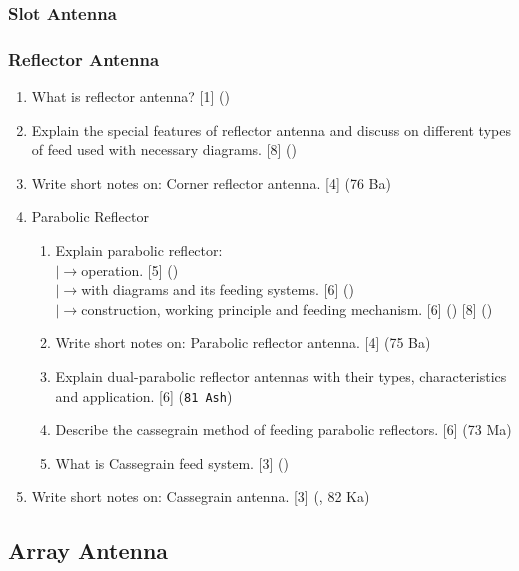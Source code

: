 \documentclass[12pt]{article}
\newcommand{\lb}{\\$\left|\rightarrow\right.$}
\begin{document}
    \subsubsection{Slot Antenna}

    \subsubsection{Reflector Antenna}
      \begin{enumerate}
        \item What is reflector antenna? \hfill [1] ()

        \item Explain the special features of reflector antenna and discuss on different types of feed used with necessary diagrams. \hfill [8] ()

        \item Write short notes on: Corner reflector antenna. \hfill [4] (76 Ba)

        \item Parabolic Reflector
          \begin{enumerate}[topsep=0pt]
          \item Explain parabolic reflector:
            \lb operation. \hfill [5] ()
            \lb with diagrams and its feeding systems. \hfill [6] ()
            \lb construction, working principle and feeding mechanism. \hfill [6] () [8] ()

          \item Write short notes on: Parabolic reflector antenna. \hfill [4] (75 Ba)

          \item Explain dual-parabolic reflector antennas with their types, characteristics and application. \hfill [6] (\texttt{81 Ash})

          \item Describe the cassegrain method of feeding parabolic reflectors. \hfill [6] (73 Ma)

          \item What is Cassegrain feed system. \hfill [3] ()
        \end{enumerate}

        \item Write short notes on: Cassegrain antenna. \hfill [3] (, 82 Ka)
      \end{enumerate}

  \subsection{Array Antenna}
\end{document}
